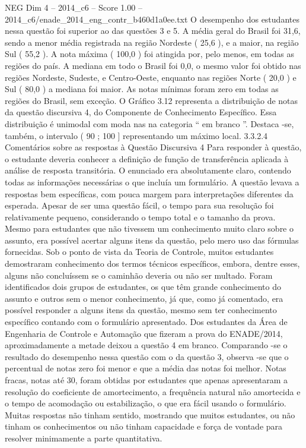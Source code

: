 \begin{textsample}{NEG Dim 4 – 2014\_c6 – Score 1.00 – 2014\_c6/enade\_2014\_eng\_contr\_b460d1a0ee.txt}
O desempenho dos estudantes nessa questão foi superior ao das questões 3 e 5.
A média geral do Brasil foi 31,6, sendo a menor média registrada na região Nordeste ( 25,6 ), e a maior, na região Sul ( 55,2 ).
A nota máxima ( 100,0 ) foi atingida por, pelo menos, em todas as regiões do país.
A mediana em todo o Brasil foi 0,0, o mesmo valor foi obtido nas regiões Nordeste, Sudeste, e Centro-Oeste, enquanto nas regiões Norte ( 20,0 ) e Sul ( 80,0 ) a mediana foi maior.
As notas mínimas foram zero em todas as regiões do Brasil, sem exceção.
O Gráfico 3.12 representa a distribuição de notas da questão discursiva 4, do Componente de Conhecimento Específico.
Essa distribuição é unimodal com moda nas na categoria “ em branco ”.
Destaca -se, também, o intervalo ( 90 ; 100 ] representando um máximo local. 3.3.2.4 Comentários sobre as respostas à Questão Discursiva 4 Para responder à questão, o estudante deveria conhecer a definição de função de transferência aplicada à análise de resposta transitória.
O enunciado era absolutamente claro, contendo todas as informações necessárias o que incluía um formulário.
A questão levava a respostas bem específicas, com pouca margem para interpretações diferentes da esperada.
Apesar de ser uma questão fácil, o tempo para sua resolução foi relativamente pequeno, considerando o tempo total e o tamanho da prova.
Mesmo para estudantes que não tivessem um conhecimento muito claro sobre o assunto, era possível acertar alguns itens da questão, pelo mero uso das fórmulas fornecidas.
Sob o ponto de vista da Teoria de Controle, muitos estudantes demostraram conhecimento dos termos técnicos específicos, embora, dentre esses, alguns não concluíssem se o caminhão deveria ou não ser multado.
Foram identificados dois grupos de estudantes, os que têm grande conhecimento do assunto e outros sem o menor conhecimento, já que, como já comentado, era possível responder a alguns itens da questão, mesmo sem ter conhecimento específico contando com o formulário apresentado.
Dos estudantes da Área de Engenharia de Controle e Automação que fizeram a prova do ENADE/2014, aproximadamente a metade deixou a questão 4 em branco.
Comparando -se o resultado do desempenho nessa questão com o da questão 3, observa -se que o percentual de notas zero foi menor e que a média das notas foi melhor.
Notas fracas, notas até 30, foram obtidas por estudantes que apenas apresentaram a resolução do coeficiente de amortecimento, a frequência natural não amortecida e o tempo de acomodação ou estabilização, o que era fácil usando o formulário.
Muitas respostas não tinham sentido, mostrando que muitos estudantes, ou não tinham os conhecimentos ou não tinham capacidade e força de vontade para resolver minimamente a parte quantitativa.

\end{textsample}
